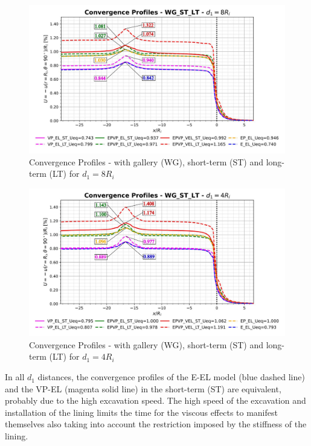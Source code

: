 \documentclass[a4paper,fleqn]{cas-sc}
\begin{document}
\begin{figure}[h!]
	\centering
	\includegraphics[scale=0.5]{Convergence Profiles - WG_ST_LT - $d_1=8R_i$.pdf}
	\caption{Convergence Profiles - with gallery (WG), short-term (ST) and long-term (LT) for $d_1 = 8R_i$}
	\label{WG-ST-LT-D1-8RI}
\end{figure}
\FloatBarrier

\begin{figure}[h!]
	\centering
	\includegraphics[scale=0.5]{Convergence Profiles - WG_ST_LT - $d_1=4R_i$.pdf}
	\caption{Convergence Profiles - with gallery (WG), short-term (ST) and long-term (LT) for $d_1 = 4R_i$}
	\label{WG-ST-LT-D1-4RI}
\end{figure}
\FloatBarrier

In all $d_1$ distances, the convergence profiles of the E-EL model (blue dashed line) and the VP-EL (magenta solid line) in the short-term (ST) are equivalent, probably due to the high excavation speed. The high speed of the excavation and installation of the lining limits the time for the viscous effects to manifest themselves also taking into account the restriction imposed by the stiffness of the lining.
\end{document}
